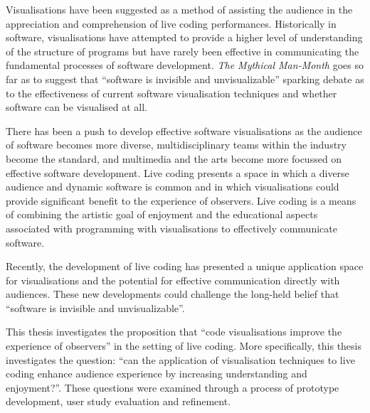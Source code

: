 


Visualisations have been suggested as a method of assisting the audience in the appreciation and comprehension of live coding performances. Historically in software, visualisations have attempted to provide a higher level of understanding of the structure of programs but have rarely been effective in communicating the fundamental processes of software development. \textit{The Mythical Man-Month} goes so far as to suggest that ``software is invisible and unvisualizable''\cite{Brooks1995} sparking debate as to the effectiveness of current software visualisation techniques and whether software can be visualised at all.

There has been a push to develop effective software visualisations as the audience of software becomes more diverse, multidisciplinary teams within the industry become the standard, and multimedia and the arts become more focussed on effective software development. Live coding presents a space in which a diverse audience and dynamic software is common and in which visualisations could provide significant benefit to the experience of observers. Live coding is a means of combining the artistic goal of enjoyment and the educational aspects associated with programming with visualisations to effectively communicate software.

Recently, the development of live coding has presented a unique application space for visualisations and the potential for effective communication directly with audiences. These new developments could challenge the long-held belief that ``software is invisible and unvisualizable''.

This thesis investigates the proposition that ``code visualisations improve the experience of observers'' in the setting of live coding. More specifically, this thesis investigates the question: ``can the application of visualisation techniques to live coding enhance audience experience by increasing understanding and enjoyment?''. These questions were examined through a process of prototype development, user study evaluation and refinement.

